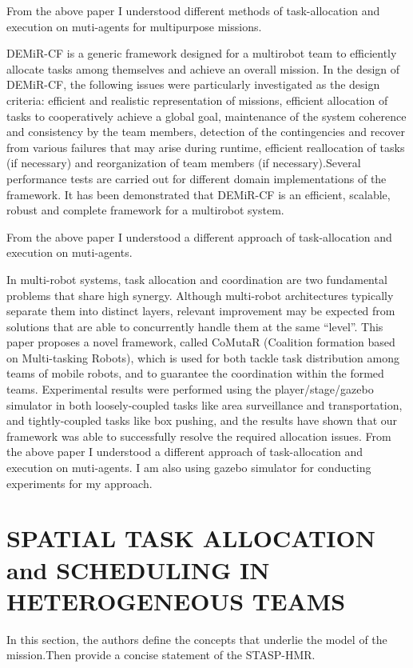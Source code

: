 \documentclass[conference]{IEEEtran}
\begin{document}
From the above paper I understood different methods of task-allocation and execution on muti-agents for multipurpose missions.

DEMiR-CF is a generic framework designed for a multirobot team to efficiently allocate tasks among themselves and achieve an overall mission. In the design of DEMiR-CF, the following issues were particularly investigated as the design criteria: efficient and realistic representation of missions, efficient allocation of tasks to cooperatively achieve a global goal, maintenance of the system coherence and consistency by the team members, detection of the contingencies and recover from various failures that may arise during runtime, efficient reallocation of tasks (if necessary) and reorganization of team members (if necessary).Several performance tests are carried out for different domain implementations of the framework. It has been demonstrated that DEMiR-CF is an efficient, scalable, robust and complete framework for a multirobot system\cite{sariel2011generic}.

From the above paper I understood a different approach of task-allocation and execution on muti-agents.

In multi-robot systems, task allocation and coordination are two fundamental problems that share high synergy. Although multi-robot architectures typically separate them into distinct layers, relevant improvement may be expected from solutions that are able to concurrently handle them at the same “level”. This paper proposes a novel framework, called CoMutaR (Coalition formation based on Multi-tasking Robots), which is used for both tackle task distribution among teams of mobile robots, and to guarantee the coordination within the formed teams. Experimental results were performed using the player/stage/gazebo simulator in both loosely-coupled tasks like area surveillance and transportation, and tightly-coupled tasks like box pushing, and the results have shown that our framework was able to successfully resolve the required allocation issues\cite{shiroma2009comutar}.
From the above paper I understood a different approach of task-allocation and execution on muti-agents. I am also using gazebo simulator for conducting experiments for my approach.

\section{SPATIAL TASK ALLOCATION and SCHEDULING IN HETEROGENEOUS TEAMS}
In this section, the authors define the concepts that underlie the model of the mission.Then provide a concise statement of the STASP-HMR.
\end{document}
